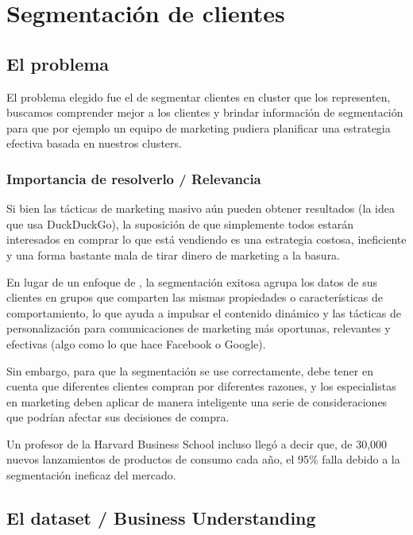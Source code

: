 \documentclass[12pt, fleqn]{report}                             %
\newcommand \Quote              {\qq}                           %
\theoremstyle{break}                                            %
\begin{document}
\part{Segmentación de clientes}

    \chapter{El problema}

        El problema elegido fue el de segmentar clientes en cluster que los representen, buscamos comprender mejor a los
        clientes y brindar información de segmentación para que por ejemplo un equipo de marketing pudiera planificar
        una estrategia efectiva basada en nuestros clusters.

        \section{Importancia de resolverlo / Relevancia}

        Si bien las tácticas de marketing masivo aún pueden obtener resultados (la idea que usa DuckDuckGo), 
        la suposición de que simplemente todos estarán interesados en comprar lo que está vendiendo es una 
        estrategia costosa, ineficiente y una forma bastante mala de tirar dinero de marketing a la basura.

        En lugar de un enfoque de \Quote{talla única}, la segmentación exitosa agrupa los datos de sus 
        clientes en grupos que comparten las mismas propiedades o características de comportamiento, 
        lo que ayuda a impulsar el contenido dinámico y las tácticas de personalización para comunicaciones 
        de marketing más oportunas, relevantes y efectivas (algo como lo que hace Facebook o Google).

        Sin embargo, para que la segmentación se use correctamente, debe tener en cuenta que 
        diferentes clientes compran por diferentes razones, y los especialistas en marketing 
        deben aplicar de manera inteligente una serie de consideraciones que podrían afectar 
        sus decisiones de compra. 
        
        Un profesor de la Harvard Business School incluso llegó a decir que, de 30,000 nuevos lanzamientos 
        de productos de consumo cada año, el 95\% falla debido a la segmentación ineficaz del mercado.

        \cite{3}

    \chapter{El dataset / Business Understanding}
\end{document}
